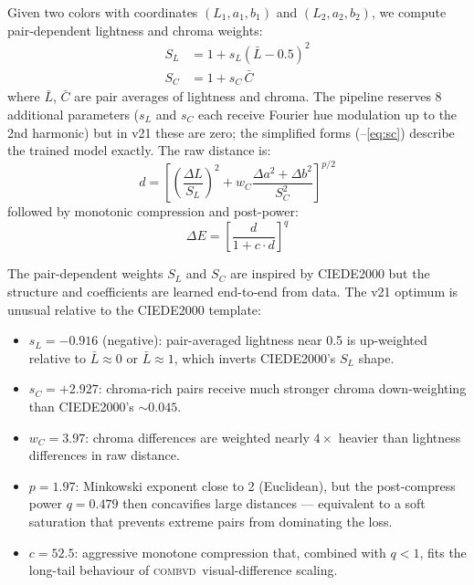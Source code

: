 \documentclass[11pt, twocolumn]{article}
\newcommand{\combvd}{\textsc{combvd}}
\begin{document}
Given two colors with coordinates $(L_1, a_1, b_1)$ and
$(L_2, a_2, b_2)$, we compute pair-dependent lightness and chroma
weights:
\begin{align}
  S_L &= 1 + s_L(\bar{L} - 0.5)^2 \label{eq:sl} \\
  S_C &= 1 + s_C \, \bar{C} \label{eq:sc}
\end{align}
where $\bar{L}$, $\bar{C}$ are pair averages of lightness and
chroma. The pipeline reserves 8 additional parameters
($s_L$ and $s_C$ each receive Fourier hue modulation up to the
2nd harmonic) but in v21 these are zero; the simplified forms
(--\ref{eq:sc}) describe the trained model exactly.
The raw distance is:
\begin{equation}
  d = \left[\left(\frac{\Delta L}{S_L}\right)^{\!2} + w_C \frac{\Delta a^2 + \Delta b^2}{S_C^2}\right]^{p/2}
  \label{eq:dist_raw}
\end{equation}
followed by monotonic compression and post-power:
\begin{equation}
  \Delta E = \left[\frac{d}{1 + c \cdot d}\right]^q
  \label{eq:dist_final}
\end{equation}

The pair-dependent weights $S_L$ and $S_C$ are inspired by
CIEDE2000 but the structure and coefficients are learned end-to-end
from data. The v21 optimum is unusual relative to the CIEDE2000
template:
\begin{itemize}
  \item $s_L = -0.916$ (negative): pair-averaged lightness near 0.5
    is up-weighted relative to $\bar{L}\!\approx\!0$ or $\bar{L}\!\approx\!1$,
    which inverts CIEDE2000's $S_L$ shape.
  \item $s_C = +2.927$: chroma-rich pairs receive much stronger
    chroma down-weighting than CIEDE2000's $\sim\!0.045$.
  \item $w_C = 3.97$: chroma differences are weighted nearly
    $4\!\times$ heavier than lightness differences in raw distance.
  \item $p = 1.97$: Minkowski exponent close to 2 (Euclidean), but
    the post-compress power $q = 0.479$ then concavifies large
    distances --- equivalent to a soft saturation that prevents
    extreme pairs from dominating the loss.
  \item $c = 52.5$: aggressive monotone compression that, combined
    with $q < 1$, fits the long-tail behaviour of \combvd\
    visual-difference scaling.
\end{itemize}
\end{document}
